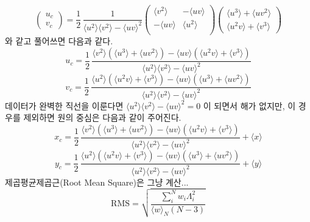 \documentclass[chapter,a4paper,10pt]{oblivoir}
\begin{document}
\begin{equation}
\left( \begin{array}{ll}
  u_c \\
  v_c
\end{array} \right)
= \frac{1}{2}\,\frac{1}{\langle u^2 \rangle \langle v^2 \rangle - \langle uv \rangle^2}
\left( \begin{array}{cc}
  \langle v^2 \rangle & -\langle uv  \rangle \\
  -\langle uv  \rangle & \langle u^2 \rangle \\
\end{array} \right)
\left( \begin{array}{ll}
  \langle u^3\rangle + \langle uv^2 \rangle \\
  \langle u^2v\rangle + \langle v^3 \rangle
\end{array} \right)
\end{equation}
와 같고 풀어쓰면 다음과 같다.
\begin{equation}
u_c = \frac{1}{2}\,\frac
{\langle v^2 \rangle \left(\langle u^3\rangle + \langle uv^2 \rangle \right)
 -\langle uv  \rangle \left( \langle u^2v\rangle + \langle v^3 \rangle \right) }
{\langle u^2 \rangle \langle v^2 \rangle - \langle uv \rangle^2}
\end{equation}
\begin{equation}
v_c = \frac{1}{2}\,\frac
{\langle u^2  \rangle \left( \langle u^2v\rangle + \langle v^3 \rangle \right)
 -\langle uv \rangle \left(\langle u^3\rangle + \langle uv^2 \rangle \right) }
{\langle u^2 \rangle \langle v^2 \rangle - \langle uv \rangle^2}
\end{equation}
데이터가 완벽한 직선을 이룬다면 $\langle u^2 \rangle \langle v^2 \rangle - \langle uv \rangle^2=0$ 이 되면서 해가 없지만, 이 경우를 제외하면 원의 중심은 다음과 같이 주어진다.
\begin{equation}
x_c = \frac{1}{2}\,\frac
{\langle v^2 \rangle \left(\langle u^3\rangle + \langle uv^2 \rangle \right)
 -\langle uv  \rangle \left( \langle u^2v\rangle + \langle v^3 \rangle \right) }
{\langle u^2 \rangle \langle v^2 \rangle - \langle uv \rangle^2} + \langle x \rangle
\end{equation}
\begin{equation}
y_c = \frac{1}{2}\,\frac
{\langle u^2  \rangle \left( \langle u^2v\rangle + \langle v^3 \rangle \right)
 -\langle uv \rangle \left(\langle u^3\rangle + \langle uv^2 \rangle \right) }
{\langle u^2 \rangle \langle v^2 \rangle - \langle uv \rangle^2} + \langle y \rangle
\end{equation}
제곱평균제곱근(Root Mean Square)은 그냥 계산...
\begin{equation}
\mathrm{RMS} = \sqrt{\frac{\sum_{i}^N w_i \Lambda_i^2 }{\langle w\rangle_N (N-3)}}
\end{equation}
\end{document}
